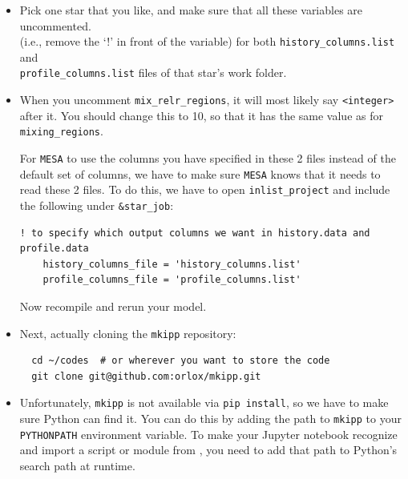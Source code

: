 \documentclass[11pt,a4paper]{article}
\begin{document}

\begin{itemize}

  \item Pick one star that you like, and make sure that all these variables are uncommented. \\
   (i.e., remove the `!' in front of the variable) for both \texttt{history\_columns.list} and \\ 
   \texttt{profile\_columns.list} files of that star's work folder.
  \item 
When you uncomment \texttt{mix\_relr\_regions}, it will most likely say \texttt{<integer>} after it. You should change this to 10, so that it has the same value as for \texttt{mixing\_regions}.


For \texttt{MESA} to use the columns you have specified in these 2 files instead of the default set of columns, we have to make sure \texttt{MESA} knows that it needs to read these 2 files. To do this, we have to open \texttt{inlist\_project} and include the following under \texttt{\&star\_job}:
\begin{lstlisting}
! to specify which output columns we want in history.data and profile.data
    history_columns_file = 'history_columns.list'
    profile_columns_file = 'profile_columns.list'
\end{lstlisting}

Now recompile and rerun your model.



  \item Next, actually cloning the \texttt{mkipp} repository:

\begin{lstlisting}
  cd ~/codes  # or wherever you want to store the code
  git clone git@github.com:orlox/mkipp.git
\end{lstlisting}


  \item Unfortunately, \texttt{mkipp} is not available via \texttt{pip install}, so we have to make sure Python can find it. 
  You can do this by adding the path to \texttt{mkipp} to your \texttt{PYTHONPATH} environment variable. 
  To make your Jupyter notebook recognize and import a script or module from , you need to add that path to Python’s search path at runtime.


\end{itemize}
\end{document}
